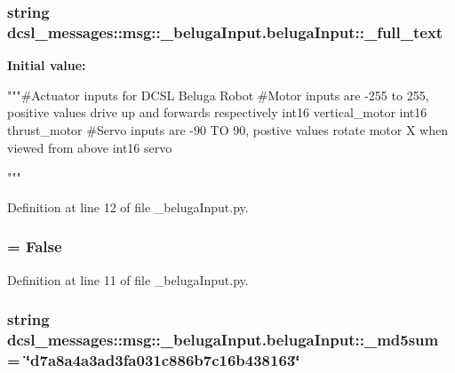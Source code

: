 \subsubsection[{\-\_\-full\-\_\-text}]{\setlength{\rightskip}{0pt plus 5cm}string {\bf dcsl\-\_\-messages\-::msg\-::\-\_\-beluga\-Input.\-beluga\-Input\-::\-\_\-full\-\_\-text}\hspace{0.3cm}{\ttfamily  [static, private]}}\label{classdcsl__messages_1_1msg_1_1__belugaInput_1_1belugaInput_a117673671010bbc2ae55814dd97d320f}
{\bfseries \-Initial value\-:}
\begin{DoxyCode}
"""#Actuator inputs for DCSL Beluga Robot
#Motor inputs are -255 to 255, positive values drive up and forwards
       respectively
int16 vertical_motor
int16 thrust_motor
#Servo inputs are -90 TO 90, postive values rotate motor X when viewed from
       above
int16 servo

"""
\end{DoxyCode}


\-Definition at line 12 of file \-\_\-beluga\-Input.\-py.

\subsubsection[{\-\_\-has\-\_\-header}]{ = \-False\hspace{0.3cm}{\ttfamily  [static, private]}}\label{classdcsl__messages_1_1msg_1_1__belugaInput_1_1belugaInput_a7e44b846c25248f7f8e1a4d6bd5df379}


\-Definition at line 11 of file \-\_\-beluga\-Input.\-py.

\subsubsection[{\-\_\-md5sum}]{\setlength{\rightskip}{0pt plus 5cm}string {\bf dcsl\-\_\-messages\-::msg\-::\-\_\-beluga\-Input.\-beluga\-Input\-::\-\_\-md5sum} = \char`\"{}d7a8a4a3ad3fa031c886b7c16b438163\char`\"{}\hspace{0.3cm}{\ttfamily  [static, private]}}\label{classdcsl__messages_1_1msg_1_1__belugaInput_1_1belugaInput_afafc4842821b034411382ed05e779aba}



